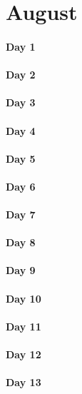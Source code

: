 \documentclass[UTF8,a4paper,8pt]{ctexart}
\begin{document}
\section{August}
 	 \paragraph{Day 1       \quad     }
 	 \paragraph{Day 2       \quad     }
 	 \paragraph{Day 3       \quad     }
 	 \paragraph{Day 4       \quad     }
 	 \paragraph{Day 5       \quad     }
 	 \paragraph{Day 6       \quad     }
 	 \paragraph{Day 7       \quad     }
 	 \paragraph{Day 8       \quad     }
 	 \paragraph{Day 9       \quad     }
 	 \paragraph{Day 10      \quad     }
 	 \paragraph{Day 11      \quad     }
 	 \paragraph{Day 12      \quad     }
 	 \paragraph{Day 13      \quad     }
\end{document}
